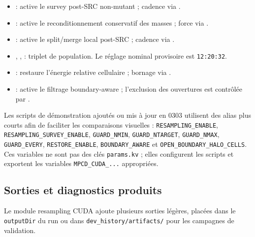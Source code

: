 \documentclass[11pt,a4paper]{article}
\begin{document}
\begin{itemize}[nosep]
  \item {} : active le survey post-SRC non-mutant ; cadence via .
  \item {} : active le reconditionnement conservatif des masses ; force via .
  \item {} : active le split/merge local post-SRC ; cadence via .
  \item {}, ,  : triplet de population. Le réglage nominal provisoire est \texttt{12:20:32}.
  \item {} : restaure l'énergie relative cellulaire ; bornage via .
  \item {} : active le filtrage boundary-aware ; l'exclusion des ouvertures est contrôlée par .
\end{itemize}


Les scripts de démonstration ajoutés ou mis à jour en 0303 utilisent des alias plus courts afin de faciliter les comparaisons visuelles : \texttt{RESAMPLING\_ENABLE}, \texttt{RESAMPLING\_SURVEY\_ENABLE}, \texttt{GUARD\_NMIN}, \texttt{GUARD\_NTARGET}, \texttt{GUARD\_NMAX}, \texttt{GUARD\_EVERY}, \texttt{RESTORE\_ENABLE}, \texttt{BOUNDARY\_AWARE} et \texttt{OPEN\_BOUNDARY\_HALO\_CELLS}. Ces variables ne sont pas des clés \texttt{params.kv} ; elles configurent les scripts et exportent les variables \texttt{MPCD\_CUDA\_...} appropriées.

\subsection{Sorties et diagnostics produits}

Le module resampling CUDA ajoute plusieurs sorties légères, placées dans le \texttt{outputDir} du run ou dans \texttt{dev\_history/artifacts/} pour les campagnes de validation.
\end{document}
